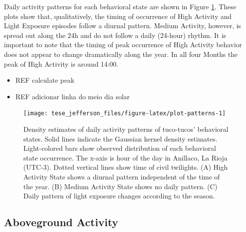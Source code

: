 \documentclass[english,msc,numbers,hidelinks]{coppe}
\providecommand{\tightlist}{%
  \setlength{\itemsep}{0pt}\setlength{\parskip}{0pt}}
\begin{document}
  Daily activity patterns for each behavioral state are shown in Figure \ref{fig:plot-patterns}. These plots show that, qualitatively, the timing of occurrence of High Activity and Light Exposure episodes follow a diurnal pattern. Medium Activity, however, is spread out along the 24h and do not follow a daily (24-hour) rhythm. It is important to note that the timing of peak occurrence of High Activity behavior does not appear to change dramatically along the year. In all four Months the peak of High Activity is around 14:00.
  \begin{itemize}
  \tightlist
  \item
    REF calculate peak
  \item
    REF adicionar linha do meio dia solar
  \end{itemize}
  \newpage
  \begin{figure}

  {\centering \texttt{[image: tese\_jefferson\_files/figure-latex/plot-patterns-1]} 

  }

  \caption{Density estimates of daily activity patterns of tuco-tucos' behavioral states. Solid lines indicate the Gaussian kernel density estimates. Light-colored bars show observed distribution of each behavioral state occurrence. The x-axis is hour of the day in Anillaco, La Rioja (UTC-3). Dotted vertical lines show time of civil twilights. (A) High Activity State shows a diurnal pattern independent of the time of the year. (B) Medium Activity State shows no daily pattern. (C) Daily pattern of light exposure changes according to the season.}\label{fig:plot-patterns}
  \end{figure}
  \clearpage

  \hypertarget{aboveground-activity-1}{%
  \subsection{Aboveground Activity}\label{aboveground-activity-1}}
\end{document}
